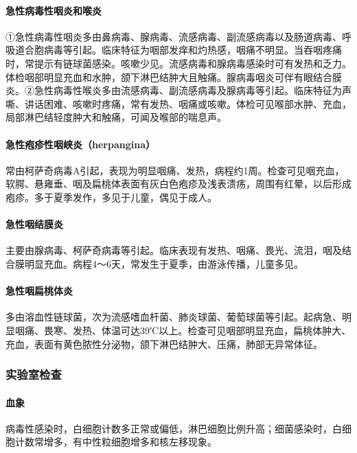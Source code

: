 \paragraph{急性病毒性咽炎和喉炎}

①急性病毒性咽炎多由鼻病毒、腺病毒、流感病毒、副流感病毒以及肠道病毒、呼吸道合胞病毒等引起。临床特征为咽部发痒和灼热感，咽痛不明显。当吞咽疼痛时，常提示有链球菌感染。咳嗽少见。流感病毒和腺病毒感染时可有发热和乏力。体检咽部明显充血和水肿，颌下淋巴结肿大且触痛。腺病毒咽炎可伴有眼结合膜炎。②急性病毒性喉炎多由流感病毒、副流感病毒及腺病毒等引起。临床特征为声嘶、讲话困难、咳嗽时疼痛，常有发热、咽痛或咳嗽。体检可见喉部水肿、充血，局部淋巴结轻度肿大和触痛，可闻及喉部的喘息声。

\paragraph{急性疱疹性咽峡炎（herpangina）}

常由柯萨奇病毒A引起，表现为明显咽痛、发热，病程约1周。检查可见咽充血，软腭、悬雍垂、咽及扁桃体表面有灰白色疱疹及浅表溃疡，周围有红晕，以后形成疱疹。多于夏季发作，多见于儿童，偶见于成人。

\paragraph{急性咽结膜炎}

主要由腺病毒、柯萨奇病毒等引起。临床表现有发热、咽痛、畏光、流泪，咽及结合膜明显充血。病程4～6天，常发生于夏季，由游泳传播，儿童多见。

\paragraph{急性咽扁桃体炎}

多由溶血性链球菌，次为流感嗜血杆菌、肺炎球菌、葡萄球菌等引起。起病急、明显咽痛、畏寒、发热、体温可达39℃以上。检查可见咽部明显充血，扁桃体肿大、充血，表面有黄色脓性分泌物，颌下淋巴结肿大、压痛，肺部无异常体征。

\subsubsection{实验室检查}

\paragraph{血象}

病毒性感染时，白细胞计数多正常或偏低，淋巴细胞比例升高；细菌感染时，白细胞计数常增多，有中性粒细胞增多和核左移现象。

